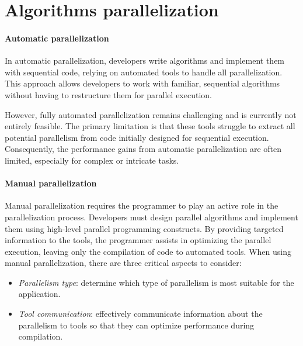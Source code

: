 \section{Algorithms parallelization}

\paragraph*{Automatic parallelization}
In automatic parallelization, developers write algorithms and implement them with sequential code, relying on automated tools to handle all parallelization. 
This approach allows developers to work with familiar, sequential algorithms without having to restructure them for parallel execution.

However, fully automated parallelization remains challenging and is currently not entirely feasible. 
The primary limitation is that these tools struggle to extract all potential parallelism from code initially designed for sequential execution. 
Consequently, the performance gains from automatic parallelization are often limited, especially for complex or intricate tasks.

\paragraph*{Manual parallelization}
Manual parallelization requires the programmer to play an active role in the parallelization process. 
Developers must design parallel algorithms and implement them using high-level parallel programming constructs. 
By providing targeted information to the tools, the programmer assists in optimizing the parallel execution, leaving only the compilation of code to automated tools.
When using manual parallelization, there are three critical aspects to consider:
\begin{itemize} 
    \item \textit{Parallelism type}: determine which type of parallelism is most suitable for the application. 
    \item \textit{Tool communication}: effectively communicate information about the parallelism to tools so that they can optimize performance during compilation. 
\end{itemize}

